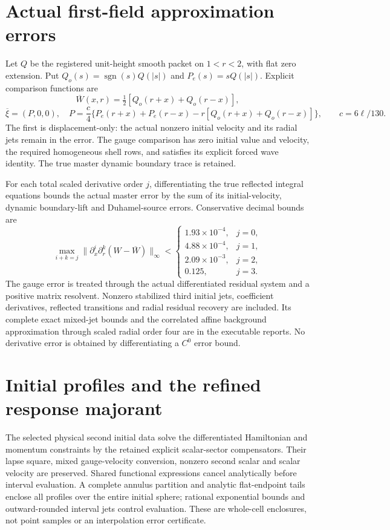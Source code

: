 \documentclass[11pt]{article}
\begin{document}
\section{Actual first-field approximation errors}
Let $Q$ be the registered unit-height smooth packet on $1<r<2$, with flat zero extension. Put $Q_o(s)=\operatorname{sgn}(s)Q(|s|)$ and $P_e(s)=sQ(|s|)$. Explicit comparison functions are
\[
\overline W(x,r)=\tfrac12[Q_o(r+x)+Q_o(r-x)],
\]
\[
\overline\xi=(P,0,0),\quad P=\frac c4\{P_e(r+x)+P_e(r-x)
-r[Q_o(r+x)+Q_o(r-x)]\},\qquad c=6\ell/130.
\]
The first is displacement-only: the actual nonzero initial velocity and its radial jets remain in the error. The gauge comparison has zero initial value and velocity, the required homogeneous shell rows, and satisfies its explicit forced wave identity. The true master dynamic boundary trace is retained.

For each total scaled derivative order $j$, differentiating the true reflected integral equations bounds the actual master error by the sum of its initial-velocity, dynamic boundary-lift and Duhamel-source errors. Conservative decimal bounds are
\[
\max_{i+k=j}\|\partial_x^i\partial_r^k(W-\overline W)\|_\infty
<\begin{cases}
1.93\times10^{-4},&j=0,\\
4.88\times10^{-4},&j=1,\\
2.09\times10^{-3},&j=2,\\
0.125,&j=3.
\end{cases}
\]
The gauge error is treated through the actual differentiated residual system and a positive matrix resolvent. Nonzero stabilized third initial jets, coefficient derivatives, reflected transitions and radial residual recovery are included. Its complete exact mixed-jet bounds and the correlated affine background approximation through scaled radial order four are in the executable reports. No derivative error is obtained by differentiating a $C^0$ error bound.

\section{Initial profiles and the refined response majorant}
The selected physical second initial data solve the differentiated Hamiltonian and momentum constraints by the retained explicit scalar-sector compensators. Their lapse square, mixed gauge-velocity conversion, nonzero second scalar and scalar velocity are preserved. Shared functional expressions cancel analytically before interval evaluation. A complete annulus partition and analytic flat-endpoint tails enclose all profiles over the entire initial sphere; rational exponential bounds and outward-rounded interval jets control evaluation. These are whole-cell enclosures, not point samples or an interpolation error certificate.
\end{document}
